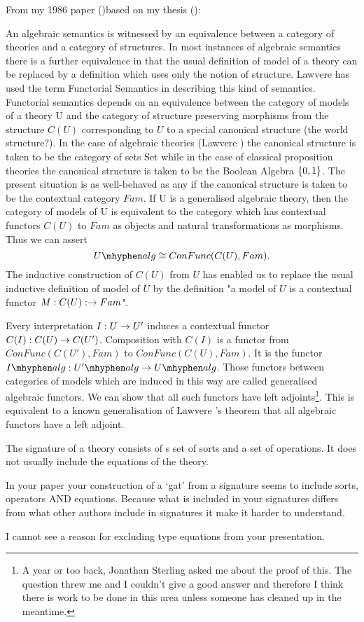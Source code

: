 \note From my 1986 paper (\cite{Cartmell86})based on my thesis (\cite{Cartmell78}):
\begin{tightquote}
An algebraic semantics is witnessed by an equivalence between a category of
theories and a category of structures. In most instances of algebraic semantics
there is a further equivalence in that the usual definition of model of a theory can
be replaced by a definition which uses only the notion of structure. Lawvere has
used the term Functorial Semantics in describing this kind of semantics.
Functorial semantics depends on an equivalence between the category of models
of a theory U and the category of structure preserving morphisms from the
structure $C(U)$ corresponding to $U$ to a special canonical structure (the world
structure?). In the case of algebraic theories (Lawvere \cite{LawvereAlgebraicTheories}) the canonical structure
is taken to be the category of sets Set while in the case of classical proposition
theories the canonical structure is taken to be the Boolean Algebra $\left\{0, 1\right\}$.
The present situation is as well-behaved as any if the canonical structure is
taken to be the contextual category $Fam$.
If U is a generalised algebraic theory, then the category of models of U is
equivalent to the category which has contextual functors $C(U)$ to $Fam$ as objects
and natural transformations as morphisms. Thus we can assert
\begin{equation*}
\Ualg \cong ConFunc(C(U), Fam).
\end{equation*}
The inductive construction of $C(U)$ from $U$ has enabled us to replace the usual 
inductive definition of model of $U$ by the definition "a model of $U$ is a contextual
functor $M: C(U): \rightarrow Fam$".

Every interpretation $I:U \rightarrow U'$ induces a contextual functor 
$C(I):C(U) \rightarrow C(U')$. Composition with $C(I)$ is a functor from 
$ConFunc(C(U'),Fam)$ to
$ConFunc(C(U),Fam)$. It is the functor $\Ialg:\Upalg \morph \Ualg$. Those functors
between categories of models which are induced in this way are called generalised
algebraic functors. We can show that all such functors have left adjoints\footnote{A year or too back, Jonathan Sterling asked me about the proof of this. The question threw me and I couldn't give a good answer and therefore I think there is work to be done in this area unless someone has cleaned up in the meantime.}.
This is
equivalent to a known generalisation of Lawvere \cite{LawvereAlgebraicTheories}'s theorem that all algebraic
functors have a left adjoint. 
\end{tightquote}

\note
The signature of a theory consists of s set of sorts and a set of operations. It does not usually include the equations of the theory. 
\begin{notebox}
In your paper your construction of a `gat' from a signature seems to include sorts, operators AND equations. Because 
what is included in your signatures differs from what other authors include in signatures it make it harder to understand.
\end{notebox}
\begin{notebox} 
I cannot see a reason for excluding type equations from your presentation.
\end{notebox}

